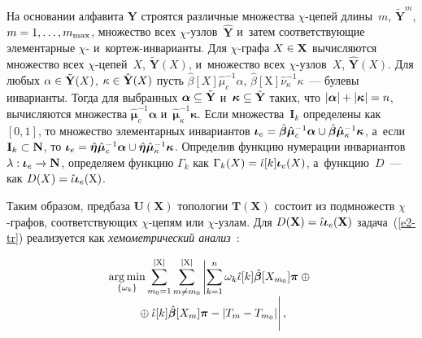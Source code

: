 \begin{multicols}{2}
\vspace*{-2pt}

     На основании алфавита $\mathbf{Y}$ строятся различные множества $\chi$-це\-пей 
длины~$m$, $\tilde{\mathbf{Y}}^m$, $m\hm=1,\ldots , m_{\max}$, множество всех  
$\chi$-уз\-лов~$\hat{\mathbf{Y}}$ и~затем со\-от\-вет\-ст\-ву\-ющие элементарные  
$\chi$- и~кор\-теж-ин\-ва\-ри\-ан\-ты. Для $\chi$-гра\-фа 
${X}\hm\in \mathbf{X}$ вычисляются множество всех  
$\chi$-це\-пей~${X}$, $\tilde{\mathbf{Y}}({X})$, и~множество 
всех $\chi$-уз\-лов~${X}$, $\hat{\mathbf{Y}}({X})$. Для 
любых $\alpha\hm\in \tilde{\mathbf{Y}}({X})$, $\kappa\hm\in 
\hat{\mathbf{Y}}({X})$  
пусть $\hat{\beta}[{X}]\hat{\mu}^{-1}_c\alpha$, 
$\hat{\beta}[\mathrm{X}]\hat{\nu}^{-1}_\kappa \kappa$~--- булевы инварианты. 
Тогда для выбранных $\boldsymbol{\alpha}\hm\subseteq \tilde{\mathbf{Y}}$ 
и~$\boldsymbol{\kappa}\hm\subseteq \hat{\mathbf{Y}}$ таких, что $\vert 
\boldsymbol{\alpha}\vert \hm+ \vert \boldsymbol{\kappa}\vert \hm= n$, 
вычисляются множества $\hat{\boldsymbol{\mu}}_c^{-1}\boldsymbol{\alpha}$ 
и~$\hat{\boldsymbol{\mu}}_\kappa^{-1}\boldsymbol{\kappa}$. Если 
множества~$\mathbf{I}_k$ определены как~$[0,1]$, то множество 
элементарных инвариантов $\boldsymbol{\iota}_e\hm= 
\hat{\boldsymbol{\beta}}\hat{\boldsymbol{\mu}}_c^{-1}\boldsymbol{\alpha}\cup 
\hat{\boldsymbol{\beta}}\hat{\boldsymbol{\mu}}_\kappa^{-
1}\boldsymbol{\kappa}$, а~если $\mathbf{I}_k \hm\subset \mathbf{N}$, то 
$\boldsymbol{\iota}_e\hm=\hat{\boldsymbol{\eta}}\hat{\boldsymbol{\mu}}_c^{-1}
\boldsymbol{\alpha}\cup 
\hat{\boldsymbol{\eta}}\hat{\boldsymbol{\mu}}_\kappa^{-
1}\boldsymbol{\kappa}$. Определив функцию нумерации инвариантов $\lambda: 
\boldsymbol{\iota}_e\hm\to \mathbf{N}$, определяем функцию $\Gamma_k$ как 
$\Gamma_k({X})\hm= \hat{\iota}[k]\boldsymbol{\iota}_e({X})$, 
а~функцию~$D$~--- как $D({X})\hm= 
\hat{\iota}\boldsymbol{\iota}_e(\mathrm{X})$. 
     
     Таким образом, предбаза $\mathbf{U}(\mathbf{X})$ топологии 
$\mathbf{T}(\mathbf{X})$ состоит из подмножеств $\chi$-гра\-фов, 
соответствующих $\chi$-це\-пям или $\chi$-уз\-лам. Для $D(\mathbf{X})\hm= 
\hat{\iota}\boldsymbol{\iota}_e(\mathbf{X})$ задача~(\ref{e2-tr}) реализуется 
как \textit{хемометрический анализ}~\cite{9-tr}:

\vspace*{-12pt}

\noindent
     \begin{multline*}
     \argmin\limits_{\{\omega_k\}} \sum\limits_{m_0=1}^{\vert 
\mathrm{X}\vert} \sum\limits_{m\not=m_0}^{\vert \mathrm{X}\vert}
     \left\vert
     \sum\limits_{k=1}^{n} 
\omega_k\hat{\iota}[k]\hat{\boldsymbol{\beta}}[X_{m_0}] \boldsymbol{\pi}\oplus{}\right.\\[-4pt]
\left.{}\oplus 
\hat{\iota}[k]\hat{\boldsymbol{\beta}}[X_m]\boldsymbol{\pi} -\vert T_m -
T_{m_0}
\vphantom{\sum\limits_{k=1}^{n}}
\vert \right\vert,
\end{multline*}


\end{multicols}
